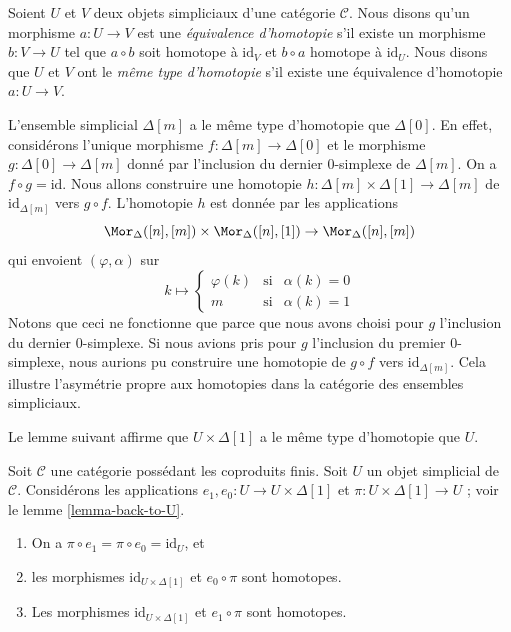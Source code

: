 \begin{definition}
\label{definition-homotopy-equivalent}
Soient $U$ et $V$ deux objets simpliciaux d'une catégorie $\mathcal{C}$.
Nous disons qu'un morphisme $a : U \to V$ est une
{\it équivalence d'homotopie} s'il existe un morphisme $b : V \to U$ tel que
$a \circ b$ soit homotope à $\text{id}_V$ et $b \circ a$ homotope à
$\text{id}_U$. Nous disons que $U$ et $V$ ont le {\it même type d'homotopie}
s'il existe une équivalence d'homotopie $a : U \to V$.
\end{definition}

\begin{example}
\label{example-simplex-contractible}
L'ensemble simplicial $\Delta[m]$ a le même type d'homotopie que $\Delta[0]$.
En effet, considérons l'unique morphisme $f : \Delta[m] \to \Delta[0]$ et
le morphisme $g : \Delta[0] \to \Delta[m]$ donné par l'inclusion du dernier
$0$-simplexe de $\Delta[m]$. On a $f \circ g = \text{id}$.
Nous allons construire une homotopie
$h : \Delta[m] \times \Delta[1] \to \Delta[m]$
de $\text{id}_{\Delta[m]}$ vers $g \circ f$. L'homotopie $h$ est donnée par les applications
$$
\Mor_\Delta([n], [m]) \times \Mor_\Delta([n], [1]) \to \Mor_\Delta([n], [m])
$$
qui envoient $(\varphi, \alpha)$ sur
$$
k \mapsto
\left\{
\begin{matrix}
\varphi(k) & \text{si} & \alpha(k) = 0 \\
m & \text{si} & \alpha(k) = 1
\end{matrix}
\right.
$$
Notons que ceci ne fonctionne que parce que nous avons choisi pour $g$
l'inclusion du dernier $0$-simplexe. Si nous avions pris pour $g$ l'inclusion du
premier $0$-simplexe, nous aurions pu construire une homotopie de
$g \circ f$ vers $\text{id}_{\Delta[m]}$. Cela illustre l'asymétrie propre
aux homotopies dans la catégorie des ensembles simpliciaux.
\end{example}

\noindent
Le lemme suivant affirme que $U \times \Delta[1]$
a le même type d'homotopie que $U$.

\begin{lemma}
\label{lemma-contractible}
Soit $\mathcal{C}$ une catégorie possédant les coproduits finis.
Soit $U$ un objet simplicial de $\mathcal{C}$.
Considérons les applications $e_1, e_0 : U \to U \times \Delta[1]$
et $\pi : U \times \Delta[1] \to U$ ; voir le
lemme \ref{lemma-back-to-U}.
\begin{enumerate}
\item On a $\pi \circ e_1 = \pi \circ e_0 = \text{id}_U$, et
\item les morphismes $\text{id}_{U \times \Delta[1]}$
et $e_0 \circ \pi$ sont homotopes.
\item Les morphismes $\text{id}_{U \times \Delta[1]}$
et $e_1 \circ \pi$ sont homotopes.
\end{enumerate}
\end{lemma}

